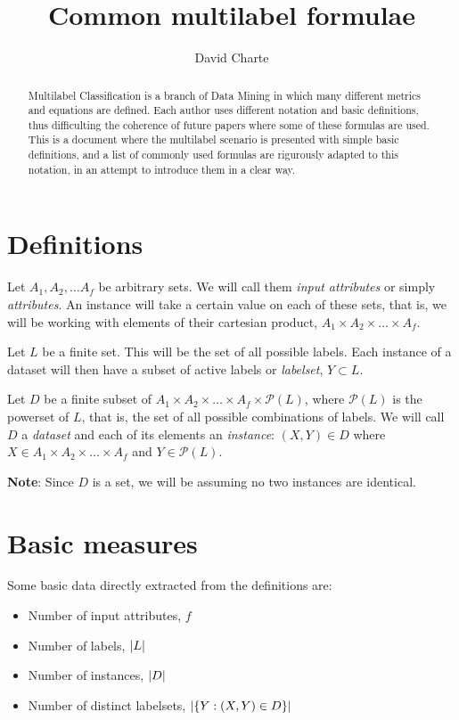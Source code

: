 \documentclass[]{article}
\title{Common multilabel formulae\\\vspace{0.5em}{\large \ldots{}under a common notation}}
\author{David Charte}
\date{}
\begin{document}
\maketitle
\begin{abstract}
Multilabel Classification is a branch of Data Mining in which many
different metrics and equations are defined. Each author uses different
notation and basic definitions, thus difficulting the coherence of
future papers where some of these formulas are used. This is a document
where the multilabel scenario is presented with simple basic
definitions, and a list of commonly used formulas are rigurously adapted
to this notation, in an attempt to introduce them in a clear way.
\end{abstract}

\section{Definitions}\label{definitions}

Let \(A_1, A_2, \dots A_f\) be arbitrary sets. We will call them
\emph{input attributes} or simply \emph{attributes}. An instance will
take a certain value on each of these sets, that is, we will be working
with elements of their cartesian product,
\(A_1\times A_2\times\dots\times A_f\).

Let \(L\) be a finite set. This will be the set of all possible labels.
Each instance of a dataset will then have a subset of active labels or
\emph{labelset}, \(Y \subset L\).

Let \(D\) be a finite subset of
\(A_1\times A_2\times\dots\times A_f\times\mathcal{P}(L)\), where
\(\mathcal{P}(L)\) is the powerset of \(L\), that is, the set of all
possible combinations of labels. We will call \(D\) a \emph{dataset} and
each of its elements an \emph{instance}: \((X, Y)\in D\) where
\(X\in A_1\times A_2\times\dots\times A_f\) and \(Y \in\mathcal{P}(L)\).

\textbf{Note}: Since \(D\) is a set, we will be assuming no two
instances are identical.

\section{Basic measures}\label{basic-measures}

Some basic data directly extracted from the definitions are:

\begin{itemize}
\itemsep1pt\parskip0pt
\item
  Number of input attributes, \(f\)
\item
  Number of labels, \(\left\lvert{L}\right\rvert\)
\item
  Number of instances, \(\left\lvert{D}\right\rvert\)
\item
  Number of distinct labelsets, \(\left\lvert{\{Y:(X, Y)\in D\}}\right\rvert\)
\end{itemize}
\end{document}
